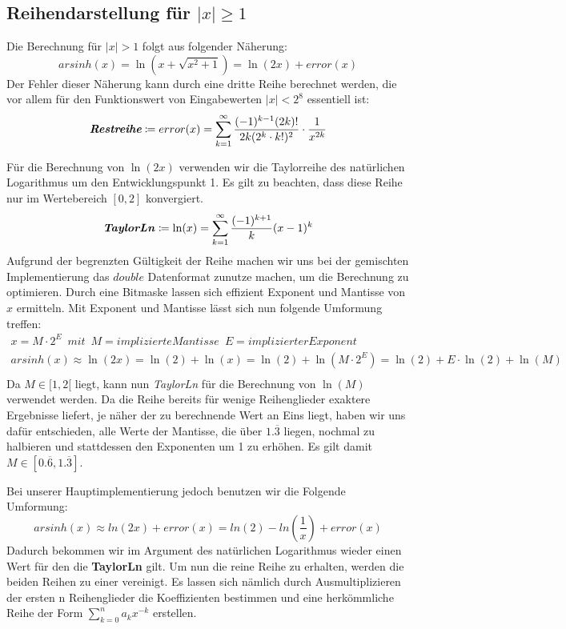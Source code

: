 \documentclass[course=erap] {aspdoc}
\begin{document}
     \subsection{Reihendarstellung für $|x|\geq 1$}
     Die Berechnung für $|x| > 1$ folgt aus folgender Näherung:
     \[
         arsinh(x) = \ln(x + \sqrt{x^2 + 1}) = \ln(2x) + error(x)
     \]
     Der Fehler dieser Näherung kann durch eine dritte Reihe berechnet werden, die vor allem für den Funktionswert von Eingabewerten $|x| < 2^{8}$ essentiell ist:
     \[
         \textit{\textbf{Restreihe}}\coloneqq error(x) =  \sum_{k = 1}^{\infty} \frac{(-1)^{k - 1}(2k)!}{2k(2^k\cdot k!)^2} \cdot \frac{1}{x^{2k}}
     \]
     
     Für die Berechnung von $\ln(2x)$ verwenden wir die Taylorreihe des natürlichen Logarithmus um den Entwicklungspunkt 1. Es gilt zu beachten, dass diese Reihe nur im Wertebereich $[0, 2]$ konvergiert.
     \[
         \textbf{\textit{TaylorLn}}\coloneqq\ln(x) = \sum_{k = 1}^{\infty} \frac{(-1)^{k + 1}}{k}(x - 1)^k
     \]
     Aufgrund der begrenzten Gültigkeit der Reihe machen wir uns bei der gemischten Implementierung das $double$ Datenformat zunutze machen, um die Berechnung zu optimieren. Durch eine Bitmaske lassen sich effizient Exponent und Mantisse von $x$ ermitteln. Mit Exponent und Mantisse lässt sich nun folgende Umformung treffen:
     \begin{gather*}
         x = M\cdot2^E \,\,\, mit \,\,\, M = implizierte Mantisse \,\,\, E = implizierter Exponent\\
         arsinh(x) \approx \ln(2x) = \ln(2) + \ln(x) = \ln(2) + \ln(M\cdot2^E) = \ln(2) + E\cdot\ln(2) + \ln(M)\\
     \end{gather*}
     Da $M\in[1, 2[$ liegt, kann nun \textit{TaylorLn} für die Berechnung von $\ln(M)$ verwendet werden. Da die Reihe bereits für wenige Reihenglieder exaktere Ergebnisse liefert, je näher der zu berechnende Wert an Eins liegt, haben wir uns dafür entschieden, alle Werte der Mantisse, die über $1.\overline{3}$ liegen, nochmal zu halbieren und stattdessen den Exponenten um 1 zu erhöhen. Es gilt damit $M\in[0.\overline{6}, 1.\overline{3}]$. 

     Bei unserer Hauptimplementierung jedoch benutzen wir die Folgende Umformung:
     \[
            arsinh(x)\approx ln(2x) + error(x) = ln(2) - ln(\frac{1}{x}) + error(x)
     \]
     Dadurch bekommen wir im Argument des natürlichen Logarithmus wieder einen Wert für den die \textbf{TaylorLn} gilt. Um nun die reine Reihe zu erhalten, werden die beiden Reihen zu einer vereinigt. Es lassen sich nämlich durch Ausmultiplizieren der ersten n Reihenglieder die Koeffizienten bestimmen und eine herkömmliche Reihe der Form $\sum_{k=0}^{n} a_k x^{-k}$ erstellen.
\end{document}
